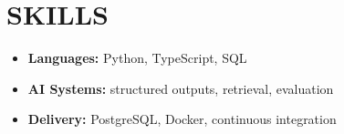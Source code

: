 \documentclass[main.tex]{subfiles}
\begin{document}
\section{SKILLS} {
  \drawline
  \begin{itemize}[leftmargin=0pt, label={}, itemsep=0pt, topsep=0pt]
    \item \textbf{Languages:} Python, TypeScript, SQL
    \item \textbf{AI Systems:} structured outputs, retrieval, evaluation
    \item \textbf{Delivery:} PostgreSQL, Docker, continuous integration
  \end{itemize}
}
\end{document}
